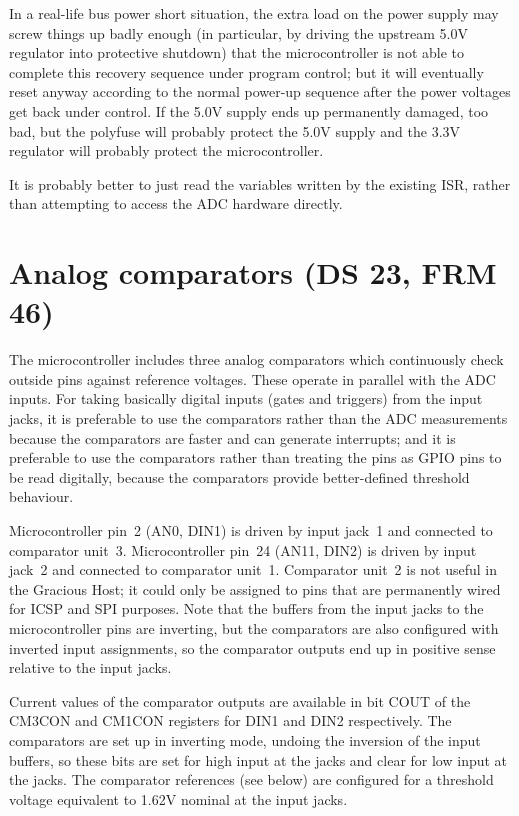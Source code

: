 In a real-life bus power short situation, the extra
load on the power supply may screw things up badly enough (in particular, by
driving the upstream 5.0V regulator into protective shutdown) that the
microcontroller is not able to complete this recovery sequence under program
control; but it will eventually reset anyway according to the normal
power-up sequence after the power voltages get back under control.  If the
5.0V supply ends up permanently damaged, too bad, but the polyfuse will
probably protect the 5.0V supply and the 3.3V regulator will probably
protect the microcontroller.

It is probably better to just read the variables written by the existing
ISR, rather than attempting to access the ADC hardware directly.


\section{Analog comparators (DS 23, FRM 46)}

The microcontroller includes three analog comparators which continuously
check outside pins against reference voltages.  These operate in parallel
with the ADC inputs.  For taking basically digital inputs (gates and
triggers) from the input jacks, it is preferable to use the comparators
rather than the ADC measurements because the comparators are faster and can
generate interrupts; and it is preferable to use the comparators rather than
treating the pins as GPIO pins to be read digitally, because the comparators
provide better-defined threshold behaviour.

Microcontroller pin~2 (AN0, DIN1) is driven by input jack~1 and connected to
comparator unit~3.  Microcontroller pin~24 (AN11, DIN2) is driven by input
jack~2 and connected to comparator unit~1.  Comparator unit~2 is not useful
in the Gracious Host; it could only be assigned to pins that are permanently
wired for ICSP and SPI purposes.  Note that the buffers from the input jacks
to the microcontroller pins are inverting, but the comparators are also
configured with inverted input assignments, so the comparator outputs end up
in positive sense relative to the input jacks.

Current values of the comparator outputs are available in bit COUT of the
CM3CON and CM1CON registers for DIN1 and DIN2 respectively.  The
comparators are set up in inverting mode, undoing the inversion of the input
buffers, so these bits are set for high input at the jacks and clear for low
input at the jacks.  The comparator references (see below) are configured
for a threshold voltage equivalent to 1.62V nominal at the input jacks.


